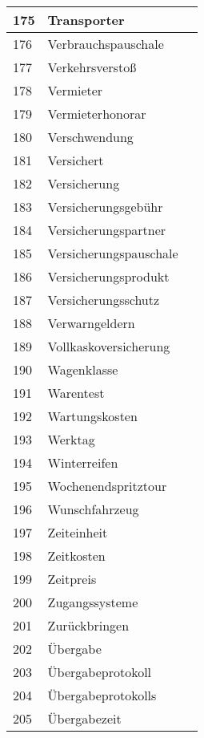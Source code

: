 \begin{longtable}{|m{1.5cm}|m{3cm}|m{8.5cm}|}
	\hline
	175 & Transporter & \\
	\hline
	176 & Verbrauchspauschale & \\
	\hline
	177 & Verkehrsverstoß & \\
	\hline
	178 & Vermieter & \\
	\hline
	179 & Vermieterhonorar & \\
	\hline
	180 & Verschwendung & \\
	\hline
	181 & Versichert & \\
	\hline
	182 & Versicherung & \\
	\hline
	183 & Versicherungsgebühr & \\
	\hline
	184 & Versicherungspartner & \\
	\hline
	185 & Versicherungspauschale & \\
	\hline
	186 & Versicherungsprodukt & \\
	\hline
	187 & Versicherungsschutz & \\
	\hline
	188 & Verwarngeldern & \\
	\hline
	189 & Vollkaskoversicherung & \\
	\hline
	190 & Wagenklasse & \\
	\hline
	191 & Warentest & \\
	\hline
	192 & Wartungskosten & \\
	\hline
	193 & Werktag & \\
	\hline
	194 & Winterreifen & \\
	\hline
	195 & Wochenendspritztour & \\
	\hline
	196 & Wunschfahrzeug & \\
	\hline
	197 & Zeiteinheit & \\
	\hline
	198 & Zeitkosten & \\
	\hline
	199 & Zeitpreis & \\
	\hline
	200 & Zugangssysteme & \\
	\hline
	201 & Zurückbringen & \\
	\hline
	202 & Übergabe & \\
	\hline
	203 & Übergabeprotokoll & \\
	\hline
	204 & Übergabeprotokolls & \\
	\hline
	205 & Übergabezeit & \\
	\hline
\end{longtable}
%
